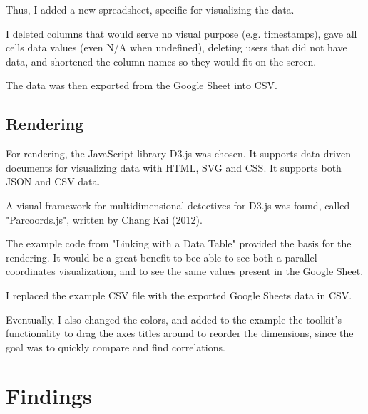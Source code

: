 Thus, I added a new spreadsheet, specific for visualizing the data.

I deleted columns that would serve no visual purpose (e.g. timestamps), gave all cells data values (even N/A when undefined), deleting users that did not have data, and shortened the column names so they would fit on the screen.

The data was then exported from the Google Sheet into CSV.

\subsection{Rendering}

For rendering, the JavaScript library D3.js was chosen. It supports data-driven documents for visualizing data with HTML, SVG and CSS. It supports both JSON and CSV data.

A visual framework for multidimensional detectives for D3.js was found, called "Parcoords.js", written by Chang Kai (2012).

The example code from "Linking with a Data Table" provided the basis for the rendering. It would be a great benefit to bee able to see both a parallel coordinates visualization, and to see the same values present in the Google Sheet. %

I replaced the example CSV file with the exported Google Sheets data in CSV.

Eventually, I also changed the colors, and added to the example the toolkit's functionality to drag the axes titles around to reorder the dimensions, since the goal was to quickly compare and find correlations.


\section{Findings}

